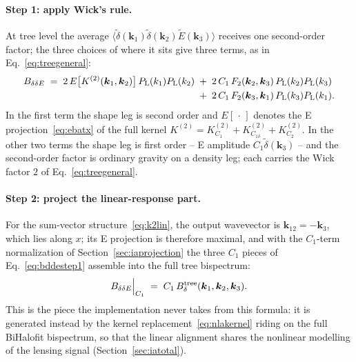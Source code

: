 \documentclass[11pt]{article}
\newcommand{\bk}{\boldsymbol{k}}
\numberwithin{equation}{section}
\begin{document}
\paragraph{Step 1: apply Wick's rule.}
At tree level the average
$\langle\tilde\delta(\bk_1)\tilde\delta(\bk_2)\tilde E(\bk_3)\rangle$
receives one second-order factor; the three choices of where it sits
give three terms, as in Eq.~\eqref{eq:treegeneral}:
\begin{equation}
\begin{split}
  B_{\delta\delta E}
  \;=\;
  2\,E\bigl[K^{(2)}(\bk_1,\bk_2)\bigr]\,
  P_{\rm L}(k_1) P_{\rm L}(k_2)
  &\;+\;
  2\,C_1\, F_2(\bk_2,\bk_3)\,
  P_{\rm L}(k_2) P_{\rm L}(k_3) \\
  &\;+\;
  2\,C_1\, F_2(\bk_3,\bk_1)\,
  P_{\rm L}(k_3) P_{\rm L}(k_1) .
\end{split}
  \label{eq:bddestep1}
\end{equation}
In the first term the shape leg is second order and
$E[\,\cdot\,]$ denotes the E projection~\eqref{eq:ebatx} of the full
kernel $K^{(2)} = K^{(2)}_{C_1} + K^{(2)}_{C_{1\delta}} +
K^{(2)}_{C_2}$.  In the other two terms the shape leg is first
order -- E amplitude $C_1\tilde\delta(\bk_3)$ -- and the
second-order factor is ordinary gravity on a density leg; each
carries the Wick factor $2$ of Eq.~\eqref{eq:treegeneral}.

\paragraph{Step 2: project the linear-response part.}
For the sum-vector structure~\eqref{eq:k2lin}, the output wavevector
is $\bk_{12} = -\bk_3$, which lies along $x$; its E projection is
therefore maximal, and with the $C_1$-term normalization of
Section~\ref{sec:iaprojection} the three $C_1$ pieces of
Eq.~\eqref{eq:bddestep1} assemble into the full tree bispectrum:
\begin{equation}
  B_{\delta\delta E}\Bigr|_{C_1}
  \;=\; C_1\, B^{\rm tree}_{\delta}(\bk_1,\bk_2,\bk_3) .
  \label{eq:bddeC1}
\end{equation}
This is the piece the implementation never takes from this formula:
it is generated instead by the kernel
replacement~\eqref{eq:nlakernel} riding on the full BiHalofit
bispectrum, so that the linear alignment shares the nonlinear
modelling of the lensing signal (Section~\ref{sec:iatotal}).
\end{document}
